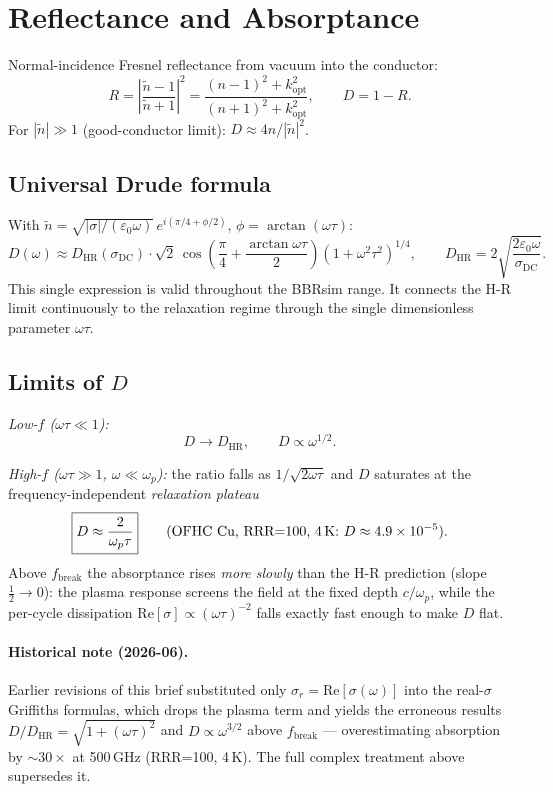 \documentclass[11pt]{article}
\begin{document}
\section{Reflectance and Absorptance}

Normal-incidence Fresnel reflectance from vacuum into the conductor:
\[
  \boxed{R = \left|\frac{\tilde{n}-1}{\tilde{n}+1}\right|^2
           = \frac{(n-1)^2 + k_\mathrm{opt}^2}{(n+1)^2 + k_\mathrm{opt}^2},}
  \qquad D = 1 - R.
\]
For $|\tilde{n}| \gg 1$ (good-conductor limit):
$D \approx 4n/|\tilde{n}|^2$.

\subsection*{Universal Drude formula}

With $\tilde{n} = \sqrt{|\sigma|/(\varepsilon_0\omega)}\,
e^{i(\pi/4+\phi/2)}$, $\phi = \arctan(\omega\tau)$:
\[
  \boxed{D(\omega)
  \approx D_\mathrm{HR}(\sigma_\mathrm{DC})\cdot
  \sqrt{2}\,\cos\!\left(\frac{\pi}{4}+\frac{\arctan\omega\tau}{2}\right)
  \left(1+\omega^2\tau^2\right)^{1/4},}
  \qquad
  D_\mathrm{HR} = 2\sqrt{\frac{2\varepsilon_0\omega}{\sigma_\mathrm{DC}}}.
\]
This single expression is valid throughout the BBRsim range.  It connects
the H-R limit continuously to the relaxation regime through the single
dimensionless parameter $\omega\tau$.

\subsection*{Limits of $D$}

\noindent\textit{Low-$f$ ($\omega\tau\ll 1$):}
\[
  D \to D_\mathrm{HR}, \qquad D \propto \omega^{1/2}.
\]

\noindent\textit{High-$f$ ($\omega\tau\gg 1$, $\omega\ll\omega_p$):}
the ratio falls as $1/\sqrt{2\omega\tau}$ and $D$ saturates at the
frequency-independent \emph{relaxation plateau}
\[
  \boxed{D \approx \frac{2}{\omega_p\tau}}
  \qquad\text{(OFHC Cu, RRR=100, 4\,K: } D \approx 4.9\times10^{-5}\text{).}
\]
Above $f_\mathrm{break}$ the absorptance rises \emph{more slowly} than the
H-R prediction (slope $\tfrac{1}{2}\to 0$): the plasma response screens the
field at the fixed depth $c/\omega_p$, while the per-cycle dissipation
$\mathrm{Re}[\sigma]\propto(\omega\tau)^{-2}$ falls exactly fast enough to
make $D$ flat.

\paragraph{Historical note (2026-06).}  Earlier revisions of this brief
substituted only $\sigma_r = \mathrm{Re}[\sigma(\omega)]$ into the real-$\sigma$
Griffiths formulas, which drops the plasma term and yields the erroneous
results $D/D_\mathrm{HR} = \sqrt{1+(\omega\tau)^2}$ and $D\propto\omega^{3/2}$
above $f_\mathrm{break}$ — overestimating absorption by ${\sim}30\times$ at
500\,GHz (RRR=100, 4\,K).  The full complex treatment above supersedes it.
\end{document}
